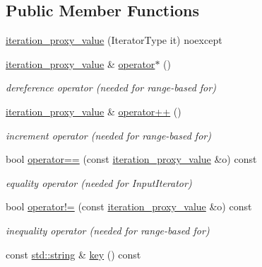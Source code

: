 \subsection*{Public Member Functions}
\begin{DoxyCompactItemize}
\item 
\hyperlink{classnlohmann_1_1detail_1_1iteration__proxy__value_a459dd8961b80b2089d8161c9aa466581}{iteration\+\_\+proxy\+\_\+value} (Iterator\+Type it) noexcept
\item 
\hyperlink{classnlohmann_1_1detail_1_1iteration__proxy__value}{iteration\+\_\+proxy\+\_\+value} \& \hyperlink{classnlohmann_1_1detail_1_1iteration__proxy__value_a10accadf05a172fdc69a016bec201e81}{operator$\ast$} ()
\begin{DoxyCompactList}\small\item\em dereference operator (needed for range-\/based for) \end{DoxyCompactList}\item 
\hyperlink{classnlohmann_1_1detail_1_1iteration__proxy__value}{iteration\+\_\+proxy\+\_\+value} \& \hyperlink{classnlohmann_1_1detail_1_1iteration__proxy__value_adf4db2aef31822f3a179435158a4de11}{operator++} ()
\begin{DoxyCompactList}\small\item\em increment operator (needed for range-\/based for) \end{DoxyCompactList}\item 
bool \hyperlink{classnlohmann_1_1detail_1_1iteration__proxy__value_a740056c5966f5a8d98bbcb925c3cf5d5}{operator==} (const \hyperlink{classnlohmann_1_1detail_1_1iteration__proxy__value}{iteration\+\_\+proxy\+\_\+value} \&o) const 
\begin{DoxyCompactList}\small\item\em equality operator (needed for Input\+Iterator) \end{DoxyCompactList}\item 
bool \hyperlink{classnlohmann_1_1detail_1_1iteration__proxy__value_a88f31e04723bdc7a5422f4ec5cb703e7}{operator!=} (const \hyperlink{classnlohmann_1_1detail_1_1iteration__proxy__value}{iteration\+\_\+proxy\+\_\+value} \&o) const 
\begin{DoxyCompactList}\small\item\em inequality operator (needed for range-\/based for) \end{DoxyCompactList}\item 
const \hyperlink{namespacenlohmann_1_1detail_a1ed8fc6239da25abcaf681d30ace4985ab45cffe084dd3d20d928bee85e7b0f21}{std\+::string} \& \hyperlink{classnlohmann_1_1detail_1_1iteration__proxy__value_aec8a1779c3b421fd42af1f1c376b9d49}{key} () const 

\end{DoxyCompactItemize}
